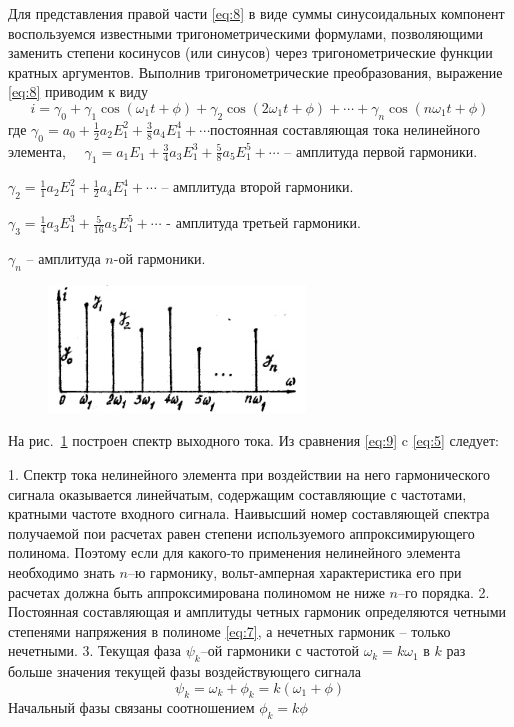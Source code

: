 Для представления правой части \eqref{eq:8} в виде суммы синусоидальных компонент воспользуемся известными тригонометрическими формулами, позволяющими заменить степени косинусов (или синусов) через тригонометрические функции кратных аргументов. Выполнив тригонометрические преобразования, выражение \eqref{eq:8} приводим к виду
\begin{equation}
i=\gamma_0+\gamma_1\cos(\omega_1t+\phi)+\gamma_2\cos(2\omega_1t+\phi)+\cdots+
\gamma_n\cos(n\omega_1t+\phi)
\label{eq:9}
\end{equation}
где $\displaystyle \gamma_0=a_0+\frac{1}{2}a_2E_1^2+\frac{3}{8}a_4E_1^4+\cdots$постоянная составляющая тока нелинейного элемента, 
$\gamma_1=a_1E_1+\frac{3}{4}a_3E_1^3+\frac{5}{8}a_5E_1^5+\cdots$ -- амплитуда первой гармоники.

\noindent $\gamma_2=\frac{1}{1}a_2E_1^2+\frac{1}{2}a_4E_1^4+\cdots$ -- амплитуда второй гармоники.

\noindent $\gamma_3=\frac{1}{4}a_3E_1^3+\frac{5}{16}a_5E_1^5+\cdots$ - амплитуда третьей гармоники.

\noindent $\gamma_n$ -- амплитуда $n$-ой гармоники.

\begin{figure}
	\centering
	\includegraphics[]{picture/pic3.jpg}
	\caption{}
	\label{pic:3}
\end{figure}

На рис.~\ref{pic:3} построен спектр выходного тока. Из сравнения \eqref{eq:9} c \eqref{eq:5} следует:

	1. Спектр тока нелинейного элемента при воздействии на него гармонического сигнала оказывается линейчатым, содержащим составляющие с частотами, кратными частоте входного сигнала. Наивысший номер составляющей спектра получаемой пои расчетах равен степени используемого аппроксимирующего полинома. Поэтому если для какого-то применения нелинейного элемента необходимо знать $n$--ю гармонику, вольт-амперная характеристика его при расчетах должна быть аппроксимирована полиномом не ниже $n$--го порядка.
	2. Постоянная составляющая и амплитуды четных гармоник определяются четными степенями напряжения в полиноме \eqref{eq:7}, а нечетных гармоник -- только нечетными.
	3. Текущая фаза $\psi_k$--ой гармоники с частотой $\omega_k=k\omega_1$ в $k$ раз больше значения текущей фазы воздействующего сигнала
\begin{equation*}
\psi_k=\omega_k+\phi_k=k(\omega_1+\phi)
\end{equation*}
Начальный фазы связаны соотношением $\phi_k=k\phi$

